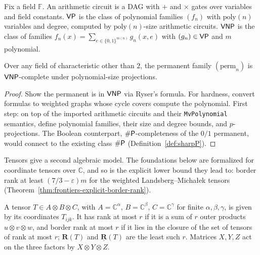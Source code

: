 \begin{definition}
  \label{def:frontiers-vp-vnp}
  Fix a field $\mathbb{F}$. An arithmetic circuit is a DAG with $+$ and $\times$
  gates over variables and field constants. $\mathsf{VP}$ is the class of polynomial
  families $(f_n)$ with $\mathrm{poly}(n)$ variables and degree, computed by
  $\mathrm{poly}(n)$-size arithmetic circuits. $\mathsf{VNP}$ is the class of families
  $f_n(x) = \sum_{e \in \{0,1\}^{m(n)}} g_n(x, e)$ with $(g_n) \in \mathsf{VP}$ and
  $m$ polynomial.
\end{definition}

\begin{theorem}
  \label{thm:frontiers-permanent}
  \notready
  Over any field of characteristic other than $2$, the permanent family
  $(\mathrm{perm}_n)$ is $\mathsf{VNP}$-complete under polynomial-size projections.
\end{theorem}
\begin{proof}
  Show the permanent is in $\mathsf{VNP}$ via Ryser's formula. For hardness, convert
  formulas to weighted graphs whose cycle covers compute the polynomial. First
  step: on top of the imported arithmetic circuits and their
  \texttt{MvPolynomial} semantics, define polynomial families, their size and
  degree bounds, and $p$-projections. The Boolean counterpart,
  $\#\mathsf{P}$-completeness of the $0/1$ permanent, would connect to the existing
  class $\#\mathsf{P}$ (Definition~\ref{def:sharpP}).
\end{proof}

Tensors give a second algebraic model. The foundations below are formalized for
coordinate tensors over $\mathbb{C}$, and so is the explicit lower bound they lead to:
border rank at least $(7/3 - \varepsilon)m$ for the weighted Landsberg--Micha{\l}ek
tensors (Theorem~\ref{thm:frontiers-explicit-border-rank}).

\begin{definition}
  \label{def:frontiers-border-rank}
  \leanok
  A tensor $T \in A \otimes B \otimes C$, with $A = \mathbb{C}^\alpha$,
  $B = \mathbb{C}^\beta$, $C = \mathbb{C}^\gamma$ for finite $\alpha, \beta, \gamma$, is
  given by its coordinates $T_{ijk}$. It has rank at most $r$ if it is a sum of $r$ outer
  products $u \otimes v \otimes w$, and border rank at most $r$ if it lies in the closure
  of the set of tensors of rank at most $r$; $\mathbf{R}(T)$ and
  $\underline{\mathbf{R}}(T)$ are the least such $r$. Matrices $X, Y, Z$ act on the three
  factors by $X \otimes Y \otimes Z$.
\end{definition}

